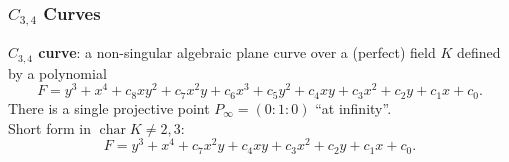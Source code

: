 \documentclass{beamer}
\newcommand{\defn}{\textbf}
\DeclareMathOperator{\Char}{char}
\begin{document}

\begin{frame}
\frametitle{$C_{3,4}$ Curves}
\defn{$C_{3,4}$ curve}: a non-singular algebraic plane curve over a (perfect) field $K$ defined by a polynomial
	\[ F = y^3 + x^4 + c_8xy^2 + c_7x^2y + c_6x^3 + c_5y^2 + c_4xy + c_3x^2 + c_2y + c_1x + c_0. \]
There is a single projective point $P_\infty = (0 : 1 : 0)$ ``at infinity''.\\
\vspace{10pt}
Short form in $\Char K \neq 2,3$:
  \[ F = y^3 + x^4 + c_7x^2y + c_4xy + c_3x^2 + c_2y + c_1x + c_0. \]
\end{frame}

\end{document}
